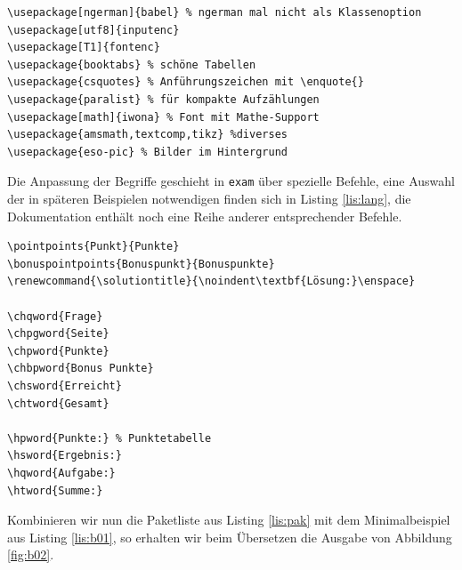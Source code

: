 \begin{lstlisting}[label={lis:pak},caption={Paketliste (pdf\LaTeX)}]
\usepackage[ngerman]{babel} % ngerman mal nicht als Klassenoption
\usepackage[utf8]{inputenc}
\usepackage[T1]{fontenc}
\usepackage{booktabs} % schöne Tabellen
\usepackage{csquotes} % Anführungszeichen mit \enquote{}
\usepackage{paralist} % für kompakte Aufzählungen
\usepackage[math]{iwona} % Font mit Mathe-Support
\usepackage{amsmath,textcomp,tikz} %diverses
\usepackage{eso-pic} % Bilder im Hintergrund
\end{lstlisting}

Die Anpassung der Begriffe geschieht in \texttt{exam} über spezielle Befehle, eine Auswahl der in späteren Beispielen notwendigen finden sich in Listing \ref{lis:lang}, die Dokumentation enthält noch eine Reihe anderer entsprechender Befehle.

\begin{lstlisting}[label={lis:lang},caption={Eindeutschung der Fachbegriffe}]
\pointpoints{Punkt}{Punkte}
\bonuspointpoints{Bonuspunkt}{Bonuspunkte}
\renewcommand{\solutiontitle}{\noindent\textbf{Lösung:}\enspace}
 
\chqword{Frage}   
\chpgword{Seite} 
\chpword{Punkte}   
\chbpword{Bonus Punkte} 
\chsword{Erreicht}   
\chtword{Gesamt}

\hpword{Punkte:} % Punktetabelle
\hsword{Ergebnis:}
\hqword{Aufgabe:}
\htword{Summe:}
\end{lstlisting}

Kombinieren wir nun die Paketliste aus Listing \ref{lis:pak} mit dem Minimalbeispiel aus Listing \ref{lis:b01}, so erhalten wir beim Übersetzen die Ausgabe von Abbildung \ref{fig:b02}.

